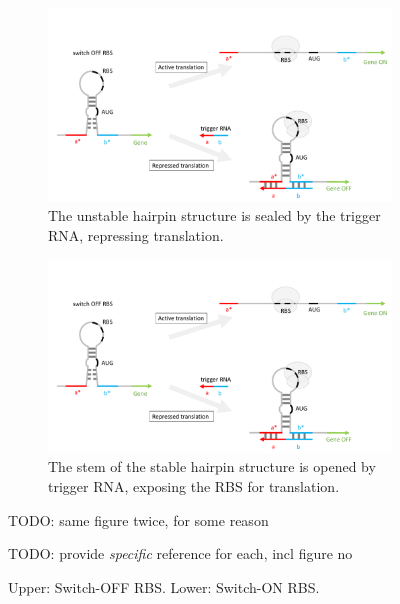 \documentclass[12pt,notitlepage]{article}
\newcommand{\TODO}[1]{\textrm{\color{red}TODO: #1}}
\newcommand{\ra}[1]{{\color{Blue}#1}}
\begin{document}
\begin{figure}
    \centering
    
    
    \begin{subfigure}{\linewidth}
        \includegraphics[width=\textwidth,page=1]{xor_ribocomputing/switch_off.pdf}
        \caption{%
            \ra{The unstable hairpin structure is sealed by 
            the trigger RNA, repressing translation.}
        }
        \label{f:switch_off_RBS}
    \end{subfigure}
    
    \begin{subfigure}{\linewidth}
        \includegraphics[width=\textwidth,page=2]{xor_ribocomputing/switch_on.pdf}
        \caption{%
            \ra{The stem of the stable hairpin structure 
            is opened by trigger RNA, 
            exposing the RBS for translation.}
        }
        \label{f:switch_on_RBS}
    \end{subfigure}
    
    \caption{Upper: Switch-OFF RBS. Lower: Switch-ON RBS.}
    \label{f:switch_RBS}
    
    \TODO{same figure twice, for some reason}
    
    \TODO{provide \emph{specific} reference for each, incl figure no}
\end{figure}
\end{document}
